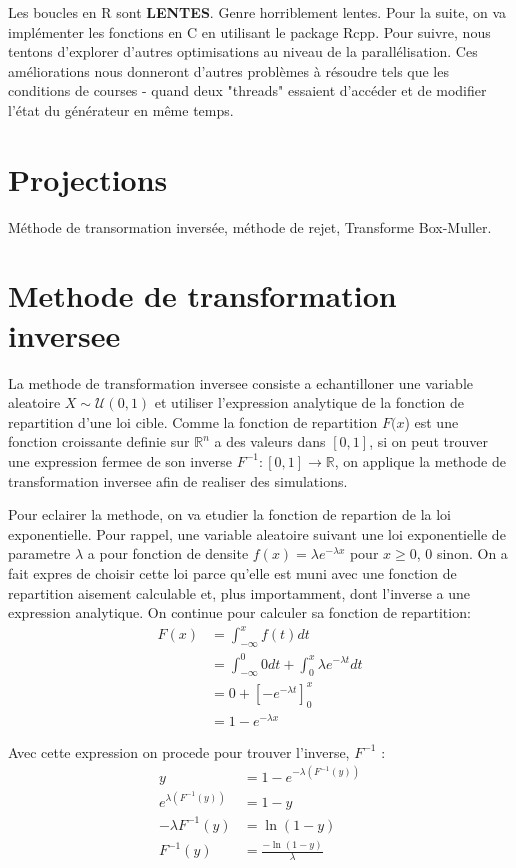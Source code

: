\documentclass[10pt]{article} %
\begin{document}
Les boucles en R sont \textbf{LENTES}. Genre horriblement lentes. Pour la suite, on va implémenter les fonctions en C en utilisant le package Rcpp. Pour suivre, nous tentons d'explorer d'autres optimisations au niveau de la parallélisation. Ces améliorations nous donneront d'autres problèmes à résoudre tels que les conditions de courses - quand deux "threads" essaient d'accéder et
de modifier l'état du générateur en même temps.

\section{Projections}

Méthode de transormation inversée, méthode de rejet, Transforme Box-Muller.

\section{Methode de transformation inversee}

La methode de transformation inversee consiste a echantilloner une variable aleatoire $X \sim \mathcal{U}(0, 1)$ et utiliser l'expression analytique
de la fonction de repartition d'une loi cible. Comme la fonction de repartition $F(x$) est une fonction croissante definie sur $\mathbb{R}^n$ a des valeurs dans
$[0, 1]$, si on peut trouver une expression fermee de son inverse $F^{-1} : [0, 1] \longrightarrow \mathbb{R}$, on applique la methode de transformation inversee
afin de realiser des simulations.

Pour eclairer la methode, on va etudier la fonction de repartion de la loi exponentielle. Pour rappel, une variable aleatoire suivant une loi exponentielle de parametre
$\lambda$ a pour fonction de densite $f(x) = \lambda e^{-\lambda x}$ pour $x \geq 0$, $0$ sinon. On a fait expres de choisir cette loi parce qu'elle est muni avec une fonction de repartition aisement calculable
et, plus importamment, dont l'inverse a une expression analytique. On continue pour calculer sa fonction de repartition:
\begin{align*}
    F(x) &= \int_{-\infty}^xf(t)dt \\
    & = \int_{-\infty}^0 0 dt + \int_0^x \lambda e^{-\lambda t} dt \\
    &= 0 + \left[-e^{-\lambda t}\right]_0^x \\
    &= 1 - e^{-\lambda x}
\end{align*}

Avec cette expression on procede pour trouver l'inverse, $F^{-1}$ :
\begin{align*}
    y &= 1 - e^{-\lambda (F^{-1}(y))} \\
    e^{\lambda (F^{-1}(y))} &= 1 - y \\
    -\lambda F^{-1}(y) &= \ln(1 - y) \\
    F^{-1}(y) &= \frac{-\ln(1 - y)}{\lambda}
\end{align*}
\end{document}
